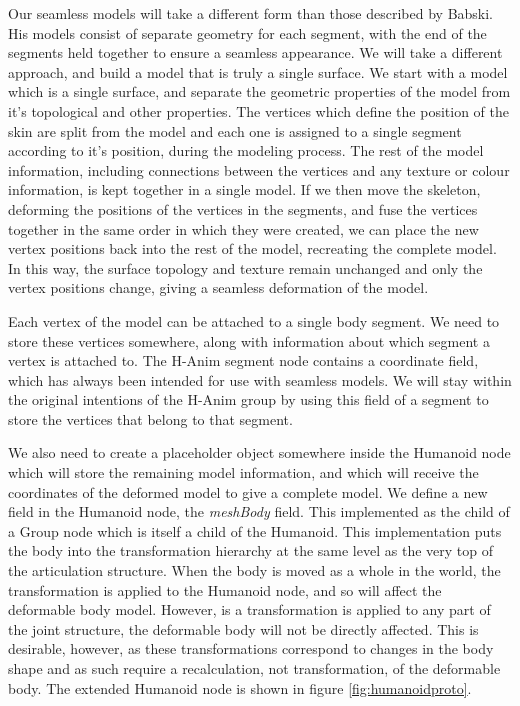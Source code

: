 \documentclass[10pt,oneside,fleqn,a4paper]{book}
\begin{document}
Our seamless models will take a different form than those described by Babski. His models consist of separate geometry for each segment, with the end of the segments held together to ensure a seamless appearance. We will take a different approach, and build a model that is truly a single surface. We start with a model which is a single surface, and separate the geometric properties of the model from it's topological and other properties. The vertices which define the position of the skin are split from the model and each one is assigned to a single segment according to it's position, during the modeling process. The rest of the model information, including connections between the vertices and any texture or colour information, is kept together in a single model. If we then move the skeleton, deforming the positions of the vertices in the segments, and fuse the vertices together in the same order in which they were created, we can place the new vertex positions back into the rest of the model, recreating the complete model. In this way, the surface topology and texture remain unchanged and only the vertex positions change, giving a seamless deformation of the model.

Each vertex of the model can be attached to a single body segment. We need to store these vertices somewhere, along with information about which segment a vertex is attached to. The H-Anim segment node contains a coordinate field, which has always been intended for use with seamless models. We will stay within the original intentions of the H-Anim group by using this field of a segment to store the vertices that belong to that segment.

We also need to create a placeholder object somewhere inside the Humanoid node which will store the remaining model information, and which will receive the coordinates of the deformed model to give a complete model. We define a new field in the Humanoid node, the {\it meshBody} field. This implemented as the child of a Group node which is itself a child of the Humanoid. This implementation puts the body into the transformation hierarchy at the same level as the very top of the articulation structure. When the body is moved as a whole in the world, the transformation is applied to the Humanoid node, and so will affect the deformable body model. However, is a transformation is applied to any part of the joint structure, the deformable body will not be directly affected. This is desirable, however, as these transformations correspond to changes in the body shape and as such require a recalculation, not transformation, of the deformable body. The extended Humanoid node is shown in figure \ref{fig:humanoidproto}.
\end{document}
